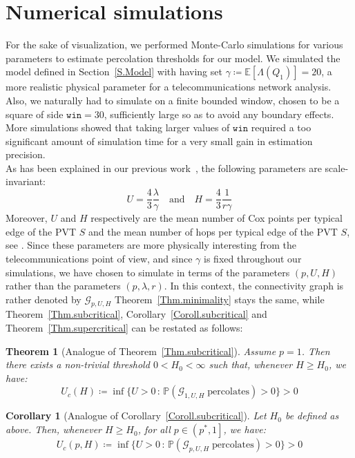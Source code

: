 \documentclass[10pt,a4paper]{amsart}
\theoremstyle{exampstyle}
\newtheorem{Theorem}{Theorem}
\newtheorem{Corollary}{Corollary}
\theoremstyle{exampnotations}
\begin{document}
\section{Numerical simulations}
\label{S.NumericalSimulations}
For the sake of visualization, we performed Monte-Carlo simulations for various parameters to estimate percolation thresholds for our model. We simulated the model defined in Section~\ref{S.Model} with having set $\gamma \coloneqq \mathbb{E}\left[\Lambda(Q_1)\right] = 20$, a more realistic physical parameter for a telecommunications network analysis. Also, we naturally had to simulate on a finite bounded window, chosen to be a square of side $\texttt{win}=30$, sufficiently large so as to avoid any boundary effects. More simulations showed that taking larger values of $\texttt{win}$ required a too significant amount of simulation time for a very small gain in estimation precision. \\
\indent As has been explained in our previous work~\cite{LeGal1904:Influence}, the following parameters are scale-invariant:
\begin{equation*}
    U=\frac{4}{3}\frac{\lambda}{\gamma} \quad \text{and} \quad H=\frac{4}{3}\frac{1}{r\gamma}
\end{equation*}
Moreover, $U$ and $H$ respectively are the mean number of Cox points per typical edge of the PVT $S$ and the mean number of hops per typical edge of the PVT $S$, see \cite[Section 9.4]{chiu_stochastic_2013}. Since these parameters are more physically interesting from the telecommunications point of view, and since $\gamma$ is fixed throughout our simulations, we have chosen to simulate in terms of the parameters $(p,U,H)$ rather than the parameters $(p,\lambda,r)$. In this context, the connectivity graph is rather denoted by $\mathcal{G}_{p,U,H}$ Theorem~\ref{Thm.minimality} stays the same, while Theorem~\ref{Thm.subcritical}, Corollary~\ref{Coroll.subcritical} and Theorem~\ref{Thm.supercritical} can be restated as follows:
\begin{Theorem}[Analogue of Theorem~\ref{Thm.subcritical}]
\label{Thm.analogue:subcritical}
Assume $p=1$. Then there exists a non-trivial threshold  $0 < H_0 < \infty$ such that, whenever $H \geq H_0$, we have:
\begin{equation*}
    U_c(H) \coloneqq \inf \lbrace U > 0 \, : \, \mathbb{P}(\mathcal{G}_{1, U, H} \; \text{percolates}) > 0 \rbrace > 0
\end{equation*}
\end{Theorem}
\begin{Corollary}[Analogue of Corollary~\ref{Coroll.subcritical}]
\label{Coroll.analogue:subcritical}
Let $H_0$ be defined as above. Then, whenever $H \geq H_0$, for all $p \in \left(p^*,1\right]$, we have:
\begin{equation*}
   U_c(p,H) \coloneqq \inf \lbrace U > 0 \, : \, \mathbb{P}(\mathcal{G}_{p, U, H} \; \text{percolates}) > 0 \rbrace > 0
\end{equation*}
\end{Corollary}
\end{document}
